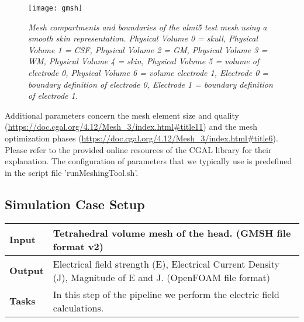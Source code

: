 \begin{figure}[H]
   \centering
   \texttt{[image: gmsh]}
   \caption{\emph{Mesh compartments and boundaries of the almi5 test mesh using a smooth skin
    representation. Physical Volume 0 = skull,
    Physical Volume 1 = CSF, Physical Volume 2 = GM, Physical Volume 3 = WM, Physical Volume 4 = skin,
    Physical Volume 5 = volume of electrode 0, Physical Volume 6 = volume electrode 1, Electrode 0 =
    boundary definition of electrode 0, Electrode 1 = boundary definition of electrode 1.}}
\end{figure}
Additional parameters concern the mesh element size and quality (\url{https://doc.cgal.org/4.12/Mesh_3/index.html#title11})
and the mesh optimization phases (\url{https://doc.cgal.org/4.12/Mesh_3/index.html#title6}). Please refer
to the provided online resources of the CGAL library for their explanation. The configuration of 
parameters that we typically use is predefined in the script file 'runMeshingTool.sh'.

\subsection{Simulation Case Setup}
\begin{tabular}{ | p{} || p{} | }
    \hline
    \textbf{Input}  & Tetrahedral volume mesh of the head. (GMSH file format v2) \\
    \hline
    \textbf{Output} & Electrical field strength (E), Electrical Current Density (J), Magnitude of
                      E and J. (OpenFOAM file format) \\ 
    \hline
    \textbf{Tasks} & In this step of the pipeline we perform the electric field calculations. \\
    \hline
\end{tabular}

\hspace{0.5cm}

